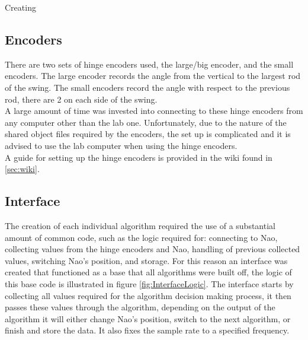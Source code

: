 \documentclass[11pt]{article}
\newcommand*\ruleline[1]{\par\noindent\raisebox{.8ex}{\makebox[\linewidth]{\hrulefill\hspace{1ex}\raisebox{-.8ex}{#1}\hspace{1ex}\hrulefill}}}
\begin{document}
Creating 

\subsection{Encoders}
\ruleline{George Sheppard}
There are two sets of hinge encoders used, the large/big encoder, and the small encoders. The large encoder records the angle from the vertical to the largest rod of the swing. The small encoders record the angle with respect to the previous rod, there are 2 on each side of the swing.\\

A large amount of time was invested into connecting to these hinge encoders from any computer other than the lab one. Unfortunately, due to the nature of the shared object files required by the encoders, the set up is complicated and it is advised to use the lab computer when using the hinge encoders.\\

A guide for setting up the hinge encoders is provided in the wiki found in \ref{sec:wiki}.

\subsection{Interface}\label{sec:Interface}
The creation of each individual algorithm required the use of a substantial amount of common code, such as the logic required for: connecting to Nao, collecting values from the hinge encoders and Nao, handling of previous collected values, switching Nao's position, and storage. For this reason an interface was created that functioned as a base that all algorithms were built off, the logic of this base code is illustrated in figure \ref{fig:InterfaceLogic}. The interface starts by collecting all values required for the algorithm decision making process, it then passes these values through the algorithm, depending on the output of the algorithm it will either change Nao's position, switch to the next algorithm, or finish and store the data. It also fixes the sample rate to a specified frequency.\\
\end{document}
